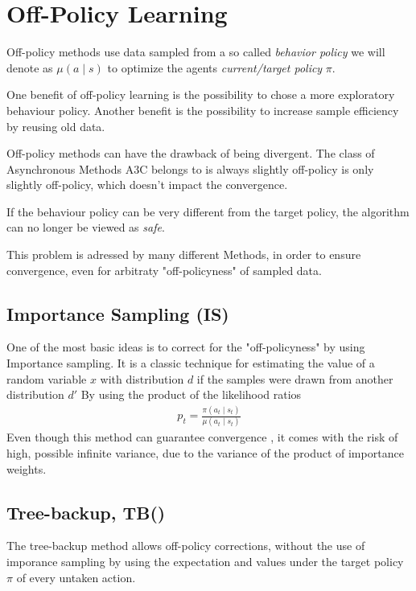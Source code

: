 \pagebreak
\section{Off-Policy Learning}
\raggedbottom 

Off-policy methods use data sampled from a so called  \textit{behavior policy} we will denote as $\mu(a \mid s)$  to optimize the agents \textit{current/target policy}  $\pi$.

One benefit of off-policy learning is the possibility to chose a more exploratory behaviour policy. 
Another benefit is the possibility to increase sample efficiency by reusing old data.
\citep{Degris12}

Off-policy methods can have the drawback of being divergent. The class of Asynchronous Methods A3C belongs to is always slightly off-policy is only slightly off-policy, which doesn't impact the convergence.

If the behaviour policy can be very different from the target policy, the algorithm can no longer be viewed as \textit{safe}. \citep{Munos16}

This problem is adressed by many different Methods, in order to ensure convergence, even for arbitraty "off-policyness" of sampled data.

\subsection{Importance Sampling (IS)}

One of the most basic ideas is to correct for the "off-policyness" by using Importance sampling.
It is a classic technique for estimating the value of a random variable $x$ with distribution $d$ if the samples were drawn from another distribution $d'$
By using the product of the likelihood ratios 
\begin{align}
{
p_t = \frac{\pi (a_t \mid s_t)}{\mu (a_t \mid s_t)}
}
\label{IW}
\end{align}
Even though this method can guarantee convergence \citep{Munos16}, it comes with the risk of high, possible infinite  variance, due to the variance of the product of importance weights.

\subsection{Tree-backup, TB(\lambda)}

The tree-backup method allows off-policy corrections, without the use of imporance sampling by using the expectation and values under the target policy $\pi$ of every untaken action. \citet{Precup00}

